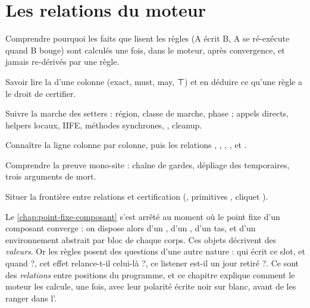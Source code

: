 \chapter{Les relations du moteur}
\label{chap:relations}

\begin{objectifs}
  \item Comprendre pourquoi les faits que lisent les règles (\og A écrit B\fg{}, \og A se ré-exécute quand B bouge\fg{}) sont calculés une fois, dans le moteur, après convergence, et jamais re-dérivés par une règle.
  \item Savoir lire la  d'une colonne (exact, must, may, ⊤) et en déduire ce qu'une règle a le droit de certifier.
  \item Suivre la marche des setters : région, classe de marche, phase ; appels directs, helpers locaux, IIFE, méthodes synchrones, , cleanup.
  \item Connaître la ligne  colonne par colonne, puis les relations , , , ,  et .
  \item Comprendre la preuve mono-site  : chaîne de gardes, dépliage des temporaires, trois arguments de mort.
  \item Situer la frontière entre relations et certification (, primitives , cliquet ).
\end{objectifs}


Le \cref{chap:point-fixe-composant} s'est arrêté au moment où le point fixe d'un composant converge : on dispose alors d'un , d'un , d'un tas, et d'un environnement abstrait par bloc de chaque corps. Ces objets décrivent des \emph{valeurs}. Or les règles posent des questions d'une autre nature : \og qui écrit ce slot, et quand ?\fg{}, \og cet effet relance-t-il celui-là ?\fg{}, \og ce listener est-il un jour retiré ?\fg{}. Ce sont des \emph{relations} entre positions du programme, et ce chapitre explique comment le moteur les calcule, une fois, avec leur polarité écrite noir sur blanc, avant de les ranger dans l'.

